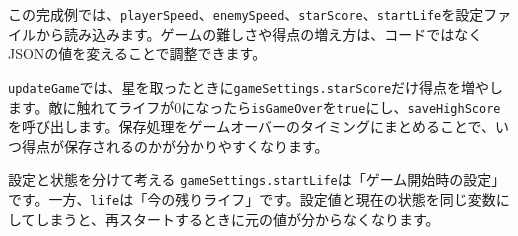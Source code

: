 \begin{listing}[htbp]
\inputminted[firstline=181,lastline=204]{ts}{typescript-p5/listings/chapter16/configurable-star-game.ts}
\caption{ゲーム全体で使う変数（\texttt{chapter16/configurable-star-game.ts}）}
\label{lst:chapter16-game-state}
\end{listing}

\begin{listing}[htbp]
\inputminted[firstline=206,lastline=250]{ts}{typescript-p5/listings/chapter16/configurable-star-game.ts}
\caption{設定を読み込む\texttt{setup}とゲームの進行（\texttt{chapter16/configurable-star-game.ts}）}
\label{lst:chapter16-setup-draw-key}
\end{listing}

\begin{listing}[htbp]
\inputminted[firstline=252,lastline=274]{ts}{typescript-p5/listings/chapter16/configurable-star-game.ts}
\caption{設定を使ってゲームを更新する（\texttt{chapter16/configurable-star-game.ts}）}
\label{lst:chapter16-update-game}
\end{listing}

\begin{listing}[htbp]
\inputminted[firstline=276,lastline=295]{ts}{typescript-p5/listings/chapter16/configurable-star-game.ts}
\caption{ゲーム画面とゲームオーバー表示（\texttt{chapter16/configurable-star-game.ts}）}
\label{lst:chapter16-display-game}
\end{listing}

\begin{listing}[htbp]
\inputminted[firstline=297,lastline=315]{ts}{typescript-p5/listings/chapter16/configurable-star-game.ts}
\caption{再スタートと最高得点の保存（\texttt{chapter16/configurable-star-game.ts}）}
\label{lst:chapter16-reset-and-save}
\end{listing}

この完成例では、\texttt{playerSpeed}、\texttt{enemySpeed}、\texttt{starScore}、\texttt{startLife}を設定ファイルから読み込みます。ゲームの難しさや得点の増え方は、コードではなくJSONの値を変えることで調整できます。

\texttt{updateGame}では、星を取ったときに\texttt{gameSettings.starScore}だけ得点を増やします。敵に触れてライフが0になったら\texttt{isGameOver}を\texttt{true}にし、\texttt{saveHighScore}を呼び出します。保存処理をゲームオーバーのタイミングにまとめることで、いつ得点が保存されるのかが分かりやすくなります。

\begin{pointbox}{設定と状態を分けて考える}
\texttt{gameSettings.startLife}は「ゲーム開始時の設定」です。一方、\texttt{life}は「今の残りライフ」です。設定値と現在の状態を同じ変数にしてしまうと、再スタートするときに元の値が分からなくなります。
\end{pointbox}


